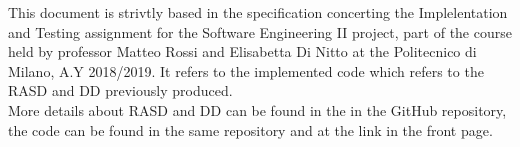 This document is strivtly based in the specification concerting the Implelentation and Testing assignment for the Software Engineering II project, part of the course held by professor Matteo Rossi and Elisabetta Di Nitto at the Politecnico di Milano, A.Y 2018/2019. It refers to the implemented code which refers to the RASD and DD previously produced.\\ More details about RASD and DD can be found in the in the GitHub repository, the code can be found in the same repository and at the link in the front page.